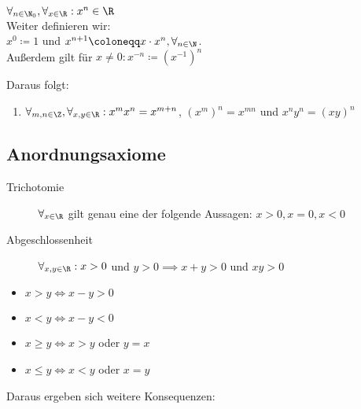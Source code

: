 \begin{definition}[Potenzen]
$\forall_{n \in \N_0}, \forall_{x \in \R} : x^{n} \in \R $ \\
Weiter definieren wir: \\
$x^{0} \coloneqq 1$ und $x^{n+1} \coloneqq x \cdot x^{n}, \forall_{n \in \N}$. \\
Außerdem gilt für $x \neq 0: x^{-n}\coloneqq (x^{-1})^{n}$
\end{definition}
Daraus folgt:
\begin{enumerate}[resume]
	\item $\forall_{m,n \in  \Z}, \forall_{x,y \in \R}: x^{m}x^{n}= x^{m+n}$, $\left(x^{m}\right)^{n}= x^{mn}$ und $x^{n}y^{n}= (xy)^{n}$   
\end{enumerate}
\subsection{Anordnungsaxiome}
\begin{description}
	\item [Trichotomie] $\forall_{x \in \R}$ gilt genau eine der folgende Aussagen: $x>0, x=0 , x<0$
	\item [Abgeschlossenheit] $\forall_{x,y \in \R}: x>0$ und $y>0 \implies x+y >0$ und $xy>0$   
\end{description}
\begin{notation}
\begin{itemize}
	\item $x>y \iff x-y >0$
	\item $x<y \iff x-y < 0$
	\item $x \ge y \iff x>y$ oder $y=x$
	\item $x\le y \iff x<y$ oder $x=y$  
\end{itemize}
\end{notation}
Daraus ergeben sich weitere Konsequenzen:

